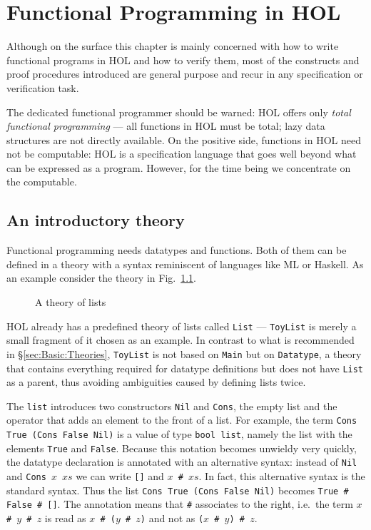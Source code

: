 \chapter{Functional Programming in HOL}

Although on the surface this chapter is mainly concerned with how to write
functional programs in HOL and how to verify them, most of the
constructs and proof procedures introduced are general purpose and recur in
any specification or verification task.

The dedicated functional programmer should be warned: HOL offers only {\em
  total functional programming} --- all functions in HOL must be total; lazy
data structures are not directly available. On the positive side, functions
in HOL need not be computable: HOL is a specification language that goes well
beyond what can be expressed as a program. However, for the time being we
concentrate on the computable.

\section{An introductory theory}
\label{sec:intro-theory}

Functional programming needs datatypes and functions. Both of them can be
defined in a theory with a syntax reminiscent of languages like ML or
Haskell. As an example consider the theory in Fig.~\ref{fig:ToyList}.

\begin{figure}[htbp]
\begin{ttbox}\makeatother
\end{ttbox}
\caption{A theory of lists}
\label{fig:ToyList}
\end{figure}

HOL already has a predefined theory of lists called \texttt{List} ---
\texttt{ToyList} is merely a small fragment of it chosen as an example. In
contrast to what is recommended in \S\ref{sec:Basic:Theories},
\texttt{ToyList} is not based on \texttt{Main} but on \texttt{Datatype}, a
theory that contains everything required for datatype definitions but does
not have \texttt{List} as a parent, thus avoiding ambiguities caused by
defining lists twice.

The  \texttt{list} introduces two constructors
\texttt{Nil} and \texttt{Cons}, the empty list and the operator that adds an
element to the front of a list. For example, the term \texttt{Cons True (Cons
  False Nil)} is a value of type \texttt{bool~list}, namely the list with the
elements \texttt{True} and \texttt{False}. Because this notation becomes
unwieldy very quickly, the datatype declaration is annotated with an
alternative syntax: instead of \texttt{Nil} and \texttt{Cons}~$x$~$xs$ we can
write \texttt{[]} and
\texttt{$x$~\#~$xs$}. In fact, this alternative syntax
is the standard syntax. Thus the list \texttt{Cons True (Cons False Nil)}
becomes \texttt{True \# False \# []}. The annotation 
means that \texttt{\#} associates to the right, i.e.\ the term \texttt{$x$ \#
  $y$ \# $z$} is read as \texttt{$x$ \# ($y$ \# $z$)} and not as \texttt{($x$
  \# $y$) \# $z$}.

